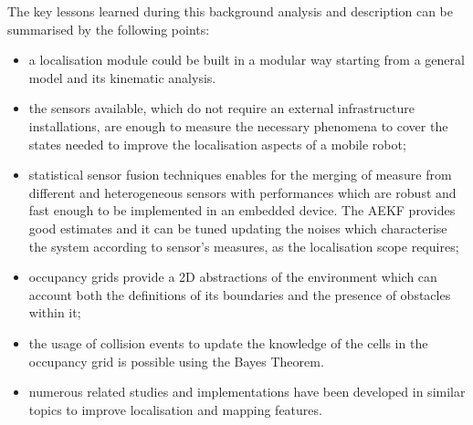 \noindent The key lessons learned during this background analysis and description can be summarised by the following points:
\begin{itemize}
    \item a localisation module could be built in a modular way starting from a general model and its kinematic analysis.%
    \item the sensors available, which do not require an external infrastructure installations, are enough to measure the necessary phenomena to cover the states needed to improve the localisation aspects of a mobile robot;
    \item statistical sensor fusion techniques enables for the merging of measure from different and heterogeneous sensors with performances which are robust and fast enough to be implemented in an embedded device. 
    The \gls{AEKF} provides good estimates and it can be tuned updating the noises which characterise the system according to sensor's measures, as the localisation scope requires;
    \item occupancy grids provide a \gls{2D} abstractions of the environment which can account both the definitions of its boundaries and the presence of obstacles within it;
    \item the usage of collision events to update the knowledge of the cells in the occupancy grid is possible using the Bayes Theorem.
    \item numerous related studies and implementations have been developed in similar topics to improve localisation and mapping features.%
\end{itemize}



\cleardoublepage
